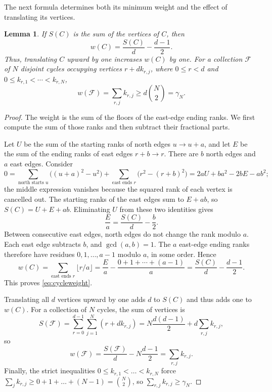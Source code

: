 \documentclass[12pt,reqno]{amsart}
\numberwithin{equation}{section}
\newtheorem{lemma}[theorem]{Lemma}
\theoremstyle{definition}
\theoremstyle{remark}
\theoremstyle{plain}
\begin{document}
The next formula determines both its minimum weight and the effect of
translating its vertices.
\begin{lemma}\label{lem:cycleweight}
If $S(C)$ is the sum of the vertices of $C$, then
\begin{equation}\label{eq:cycleweight}
 w(C)=\frac{S(C)}d-\frac{d-1}2.
\end{equation}
Thus, translating $C$ upward by one increases $w(C)$ by one.
For a collection $\mathcal{F}$ of $N$ disjoint cycles occupying vertices
$r+d k_{r,j}$, where $0\le r<d$ and
$0\le k_{r,1}<\cdots<k_{r,N}$,
\begin{equation}\label{eq:totalweight}
 w(\mathcal F)=\sum_{r,j}k_{r,j}\ge d\binom N2=\gamma_N.
\end{equation}
\end{lemma}
\begin{proof}
The weight is the sum of the floors of the east-edge ending ranks.
We first compute the sum of those ranks and then subtract their
fractional parts.

Let $U$ be the sum of the starting ranks of north edges $u\to u+a$, and let $E$
be the sum of the ending ranks of east edges $r+b\to r$.  There are $b$ north
edges and $a$ east edges.  Consider
\[
 0=\sum_{\text{north starts }u}\bigl((u+a)^2-u^2\bigr)
   +\sum_{\text{east ends }r}\bigl(r^2-(r+b)^2\bigr)
   =2aU+ba^2-2bE-ab^2;
\]
the middle expression vanishes because the squared rank of each vertex is cancelled out.
The starting ranks of the east edges sum to $E+ab$, so
$S(C)=U+E+ab$.  Eliminating $U$ from these two identities gives
\[
 \frac Ea=\frac{S(C)}d-\frac b2.
\]
Between consecutive east edges, north edges do not change the rank
modulo $a$.  Each east edge subtracts $b$, and $\gcd(a,b)=1$.
The $a$ east-edge ending ranks therefore have residues
$0,1,\ldots,a-1$ modulo $a$, in some order.  Hence
\[
 w(C)=\sum_{\text{east ends }r}\lfloor r/a\rfloor
      =\frac Ea-\frac{0+1+\cdots+(a-1)}a
      =\frac{S(C)}d-\frac{d-1}2.
\]
This proves \eqref{eq:cycleweight}.  

Translating all $d$ vertices
upward by one adds $d$ to $S(C)$ and thus adds one to $w(C)$.
For a collection of $N$ cycles, the sum of vertices is
\[
 S(\mathcal F)=\sum_{r=0}^{d-1}\sum_{j=1}^N(r+dk_{r,j})
 =N\frac{d(d-1)}2+d\sum_{r,j}k_{r,j},
\]
so
\[
 w(\mathcal F)=\frac{S(\mathcal F)}d-N\frac{d-1}2
 =\sum_{r,j}k_{r,j}.
\]
Finally, the strict inequalities $0\le k_{r,1}<\dots<k_{r,N}$ force $\sum_j k_{r,j}\ge 0+1+\dots+(N-1)=\binom{N}{2}$, so $\sum_{r,j}k_{r,j}\ge \gamma_N.$
\end{proof}
\end{document}
